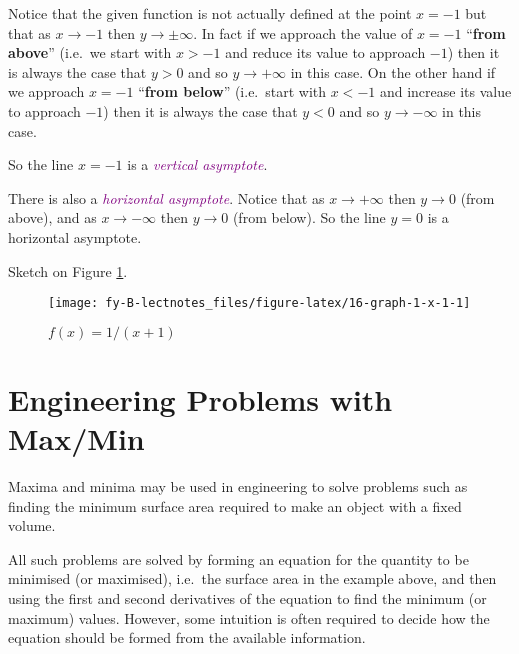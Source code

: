 \documentclass[
  english,
  11pt,
  oneside]{book}
\newcommand{\slide}{}
\theoremstyle{definition}
\theoremstyle{definition}
\theoremstyle{definition}
\theoremstyle{definition}
\theoremstyle{remark}
\begin{document}
Notice that the given function is not actually defined at the point \(x=-1\) but that as \(x\to-1\) then \(y\to\pm\infty\). In fact if we approach the value of \(x=-1\) ``\textbf{from above}'' (i.e.~we start with \(x > -1\) and reduce its value to approach \(-1\)) then it is always the case that \(y>0\) and so \(y\to+\infty\) in this case. On the other hand if we approach \(x=-1\) ``\textbf{from below}'' (i.e.~start with \(x<-1\) and increase its value to approach \(-1\)) then it is always the case that \(y<0\) and so \(y\to-\infty\) in this case.

So the line \(x=-1\) is a \textcolor{purple}{\em vertical asymptote}.

\slide

There is also a \textcolor{purple}{\em horizontal asymptote}. Notice that as \(x\to+\infty\) then \(y\to 0\) (from above), and as \(x\to-\infty\) then \(y\to0\) (from below). So the line \(y=0\) is a horizontal asymptote.

\begin{slidesonly}

\vfill

\end{slidesonly}

Sketch on Figure \ref{fig:16-graph-1-x-1}.

\begin{figure}

{\centering \texttt{[image: fy-B-lectnotes\_files/figure-latex/16-graph-1-x-1-1]} 

}

\caption{$f(x)=1/(x+1)$}\label{fig:16-graph-1-x-1}
\end{figure}

\slide

\section{Engineering Problems with Max/Min}\label{engineering-problems-with-maxmin}

Maxima and minima may be used in engineering to solve problems such as finding the minimum surface area required to make an object with a fixed volume.

All such problems are solved by forming an equation for the quantity to be minimised (or maximised), i.e.~the surface area in the example above, and then using the first and second derivatives of the equation to find the minimum (or maximum) values. However, some intuition is often required to decide how the equation should be formed from the available information.
\end{document}
